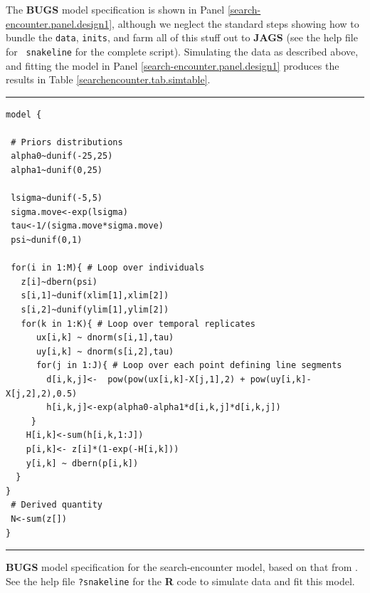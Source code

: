 The {\bf BUGS} model specification is shown in Panel
\ref{search-encounter.panel.design1}, although we neglect the standard
steps showing how to
bundle the \mbox{\tt data}, \mbox{\tt inits}, and farm
all of this stuff out to {\bf JAGS} (see the help file for \mbox{\tt
  snakeline} for the complete script).
Simulating the data as described above, and fitting the model in Panel
\ref{search-encounter.panel.design1} produces the results in Table
\ref{searchencounter.tab.simtable}.

\begin{panel}[htp]
\centering
\rule[0.15in]{\textwidth}{.03in}
{\small
\begin{verbatim}
model {

 # Priors distributions
 alpha0~dunif(-25,25)
 alpha1~dunif(0,25)

 lsigma~dunif(-5,5)
 sigma.move<-exp(lsigma)
 tau<-1/(sigma.move*sigma.move)
 psi~dunif(0,1)

 for(i in 1:M){ # Loop over individuals
   z[i]~dbern(psi)
   s[i,1]~dunif(xlim[1],xlim[2])
   s[i,2]~dunif(ylim[1],ylim[2])
   for(k in 1:K){ # Loop over temporal replicates
      ux[i,k] ~ dnorm(s[i,1],tau)
      uy[i,k] ~ dnorm(s[i,2],tau)
      for(j in 1:J){ # Loop over each point defining line segments
        d[i,k,j]<-  pow(pow(ux[i,k]-X[j,1],2) + pow(uy[i,k]-X[j,2],2),0.5)
        h[i,k,j]<-exp(alpha0-alpha1*d[i,k,j]*d[i,k,j])
     }
    H[i,k]<-sum(h[i,k,1:J])
    p[i,k]<- z[i]*(1-exp(-H[i,k]))
    y[i,k] ~ dbern(p[i,k])
  }
}
 # Derived quantity
 N<-sum(z[])
}
\end{verbatim}
}
\rule[-0.15in]{\textwidth}{.03in}
\caption{
{\bf BUGS} model specification for the search-encounter model, based
on that from \citet{royle_etal:2011mee}.
See the
help file \mbox{\tt ?snakeline} for the {\bf R} code to simulate data
and fit this model.
}
\label{search-encounter.panel.design1}
\end{panel}



